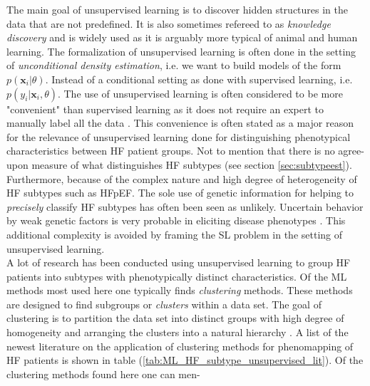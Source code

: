 \documentclass[../thesis.tex]{subfiles}
\begin{document}
\noindent The main goal of unsupervised learning is to discover hidden structures in the data that are not predefined. It is also sometimes refereed to as \textit{knowledge discovery} and is widely used as it is arguably more typical of animal and human learning. The formalization of unsupervised learning is often done in the setting of \textit{unconditional density estimation}, i.e. we want to build models of the form $p(\mathbf{x}_i | \theta)$. Instead of a conditional setting as done with supervised learning, i.e. $p(y_i | \mathbf{x}_i, \theta)$. The use of unsupervised learning is often considered to be more "convenient" than supervised learning as it does not require an expert to manually label all the data \citep{muphy2012machine}. This convenience is often stated as a major reason for the relevance of unsupervised learning done for distinguishing phenotypical characteristics between HF patient groups. Not to mention that there is no agree-upon measure of what distinguishes HF subtypes (see section \ref{sec:subtypeest}). Furthermore, because of the complex nature and high degree of heterogeneity of HF subtypes such as HFpEF. The sole use of genetic information for helping to \textit{precisely} classify HF subtypes has often been seen as unlikely. Uncertain behavior by weak genetic factors is very probable in eliciting disease phenotypes \citep{deo2015machine}. This additional complexity is avoided by framing the SL problem in the setting of unsupervised learning.\\
\indent A lot of research has been conducted using unsupervised learning to group HF patients into subtypes with phenotypically distinct characteristics. Of the ML methods most used here one typically finds \textit{clustering} methods. These methods are designed to find subgroups or \textit{clusters} within a data set. The goal of clustering is to partition the data set into distinct groups with high degree of homogeneity and arranging the clusters into a natural hierarchy \citep{friedman2009elements}. A list of the newest literature on the application of clustering methods for phenomapping of HF patients is shown in table (\ref{tab:ML_HF_subtype_unsupervised_lit}). Of the clustering methods found here one can men-


\end{document}
